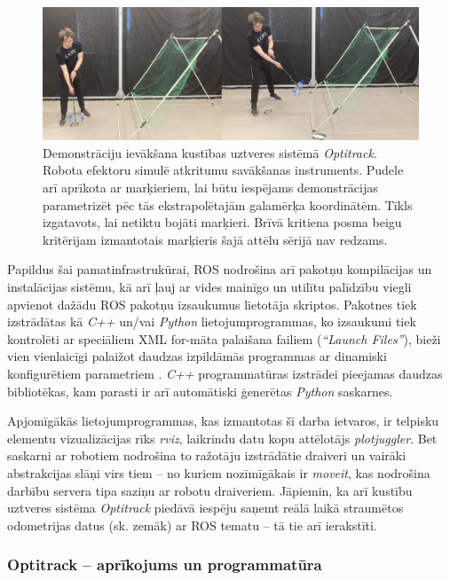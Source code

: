 \documentclass[12pt, a4paper]{article}
\numberwithin{equation}{section} %
\begin{document}
\begin{figure}[t!]
    \centering
    \includegraphics[width=16cm,page=1]{../img/throw_demo.jpg}
    \caption{Demonstrāciju ievākšana kustības uztveres sistēmā \textit{Optitrack}. Robota efektoru simulē atkritumu savākšanas instruments. Pudele arī aprīkota ar marķieriem, lai būtu iespējams demonstrācijas parametrizēt pēc tās ekstrapolētajām galamērķa koordinātēm. Tīkls izgatavots, lai netiktu bojāti marķieri. Brīvā kritiena posma beigu kritērijam izmantotais marķieris šajā attēlu sērijā nav redzams.}
\end{figure}

Papildus šai pamatinfrastrukūrai, ROS nodrošina arī pakotņu kompilācijas un instalācijas sistēmu, kā arī ļauj ar vides mainīgo un utilītu palīdzību viegli apvienot dažādu ROS pakotņu izsaukumus lietotāja skriptos. Pakotnes tiek izstrādātas kā \textit{C++} un/vai \textit{Python} lietojumprogrammas, ko izsaukumi tiek kontrolēti ar speciāliem XML for-māta palaišana failiem (\textit{``Launch Files''}), bieži vien vienlaicīgi palaižot daudzas izpildāmās programmas ar dinamiski konfigurētiem parametriem \cite{roslaunch_file}. \textit{C++} programmatūras izstrādei pieejamas daudzas bibliotēkas, kam parasti ir arī automātiski ģenerētas \textit{Python} saskarnes.

Apjomīgākās lietojumprogrammas, kas izmantotas šī darba ietvaros, ir telpisku elementu vizualizācijas rīks \textit{rviz}, laikrindu datu kopu attēlotājs \textit{plotjuggler}. Bet saskarni ar robotiem nodrošina to ražotāju izstrādātie draiveri un vairāki abstrakcijas slāņi virs tiem -- no kuriem nozīmīgākais ir \textit{moveit}, kas nodrošina darbību servera tipa saziņu ar robotu draiveriem. Jāpiemin, ka arī kustību uztveres sistēma \textit{Optitrack} piedāvā iespēju saņemt reālā laikā straumētos odometrijas datus (sk. zemāk) ar ROS tematu -- tā tie arī ierakstīti.

\subsubsection{Optitrack -- aprīkojums un programmatūra}
\end{document}
